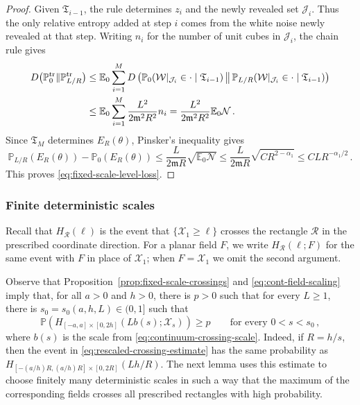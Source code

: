 \documentclass[11pt]{amsart}
\theoremstyle{plain}
\theoremstyle{definition}
\newcommand{\E}{\mathbb{E}}
\renewcommand{\P}{\mathbb{P}}
\begin{document}
\begin{proof}
Given $\mathfrak T_{i-1}$, the rule determines $z_i$ and the newly revealed set $\mathcal J_i$. Thus the only relative entropy added at step $i$ comes from the white noise newly revealed at that step. Writing $n_i$ for the number of unit cubes in $\mathcal J_i$, the chain rule gives
\[
\begin{aligned}
    D\bigl(\P_0^{\rm tr}\|\P_{L/R}^{\rm tr}\bigr)
    &\leq
    \E_0\sum_{i=1}^M
    D\left(
    \P_0(\mathcal W|_{\mathcal J_i}\in\cdot\mid \mathfrak T_{i-1})
    \,\middle\|\,
    \P_{L/R}(\mathcal W|_{\mathcal J_i}\in\cdot\mid \mathfrak T_{i-1})
    \right)\\
    &\leq
    \E_0\sum_{i=1}^M
    \frac{L^2}{2\mathfrak m^2R^2}n_i
    = \frac{L^2}{2\mathfrak m^2R^2}\E_0\mathcal N\, .
\end{aligned}
\]
Since $\mathfrak T_M$ determines $E_R(\theta)$, Pinsker's inequality gives
\[
    \P_{L/R}(E_R(\theta))-\P_0(E_R(\theta))
    \leq
    \frac{L}{2\mathfrak m R}\sqrt{\E_0\mathcal N}
    \leq
    \frac{L}{2\mathfrak m R}\sqrt{C R^{2-\alpha_1}}
    \leq C L R^{-\alpha_1/2}\, .
\]
This proves \eqref{eq:fixed-scale-level-loss}.
\end{proof}

\subsubsection{Finite deterministic scales}

Recall that $H_{\mathcal R}(\ell)$ is the event that $\{\mathcal X_1\geq\ell\}$ crosses the rectangle $\mathcal R$ in the prescribed coordinate direction. For a planar
field $F$, we write $H_{\mathcal R}(\ell;F)$ for the same event with $F$ in place of $\mathcal X_1$; when $F=\mathcal X_1$ we omit the second argument.

Observe that Proposition~\ref{prop:fixed-scale-crossings} and
\eqref{eq:cont-field-scaling} imply that, for all $a>0$ and $h>0$, there is $p>0$ such that for every $L\geq1$, there is $s_0=s_0(a,h,L)\in(0,1]$ such that
\begin{equation}\label{eq:rescaled-crossing-estimate}
    \P\left(
    H_{[-a,a]\times[0,2h]}(Lb(s);\mathcal X_s)
    \right)\geq p
    \qquad\text{for every }0<s<s_0\, ,
\end{equation}
where $b(s)$ is the scale from \eqref{eq:continuum-crossing-scale}. Indeed,
if $R=h/s$, then the event in \eqref{eq:rescaled-crossing-estimate} has the
same probability as $H_{[-(a/h)R,(a/h)R]\times[0,2R]}(Lh/R)$. The next lemma uses this estimate to choose finitely many deterministic scales in such a way that the maximum of the corresponding fields crosses all prescribed rectangles with high probability.
\end{document}
